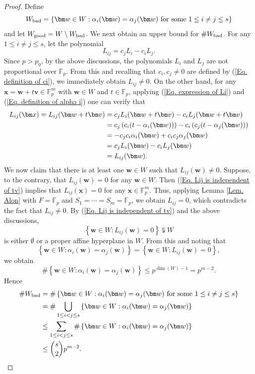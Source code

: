 \documentclass[12pt]{amsart}
\def\v{{\bm v}}
\def\w{{\bm w}}
\def\x{{\bm x}}
\def\bad{{\rm bad}}
\def\good{{\rm good}}
\theoremstyle{plain}
\theoremstyle{remark}
\begin{document}
\begin{proof}
Define 
$$W_{\bad}=\left\{\w\in W: \alpha_i(\w)=\alpha_j(\w)\ \text{for some $1\le i\neq j\le s$}\right\}$$
and let $W_{\good}=W\setminus W_{\bad}$. We next obtain an upper bound for $\# W_{\bad}$. For any $1\le i\neq j\le s$, let the polynomial
$$L_{ij}=c_jL_i-c_iL_j.$$
Since $p>p_0$, by the above discussions, the polynomials $L_i$ and $L_j$ are not proportional over $\mathbb{F}_p$. From this and recalling that  $c_i,c_j\neq 0$ are defined by (\ref{Eq. definition of ci}), we immediately obtain $L_{ij}\neq 0$. On the other hand, for any $\x=\w+t\v\in\mathbb{F}_p^m$ with $\w\in W$ and $t\in\mathbb{F}_p$, applying (\ref{Eq. expression of Li}) and (\ref{Eq. definition of alpha i}) one can verify that 
\begin{align}\label{Eq. Lij is independent of tv}
	L_{ij}(\x)=L_{ij}(\w+t\v)
&=c_jL_i(\w+t\v)-c_iL_j(\w+t\v)\notag\\
&=c_j\left(c_i(t-\alpha_i(\w))\right)-c_i\left(c_j(t-\alpha_j(\w))\right)\notag\\
&=-c_jc_i\alpha_i(\w)+c_ic_j\alpha_j(\w)\notag\\
&=c_jL_i(\w)-c_iL_j(\w)\notag\\
&=L_{ij}(\w).
\end{align}
We now claim that there is at least one $\w\in W$ such that $L_{ij}(\w)\neq 0$. Suppose, to the contrary, that $L_{ij}(\w)=0$ for any $\w\in W$. Then (\ref{Eq. Lij is independent of tv}) implies that $L_{ij}(\x)=0$ for any $\x\in\mathbb{F}_p^m$. Thus, applying Lemma \ref{Lem. Alon} with $F=\mathbb{F}_p$ and $S_1=\cdots=S_m=\mathbb{F}_p$, we obtain $L_{ij}=0$, which contradicts the fact that $L_{ij}\neq 0$. By (\ref{Eq. Lij is independent of tv}) and the above discussions, 
$$\left\{\w\in W: L_{ij}(\w)=0\right\}\subsetneqq W$$
is either $\emptyset$ or a proper affine hyperplane in $W$. From this and noting that 
$$\left\{\w\in W: \alpha_i(\w)=\alpha_j(\w)\right\}=\left\{\w\in W: L_{ij}(\w)=0\right\},$$
we obtain 
$$\#\left\{\w\in W: \alpha_i(\w)=\alpha_j(\w)\right\}\le p^{\dim(W)-1}=p^{m-2}.$$
Hence 
\begin{align}\label{Eq. upper bound for W bad}
	\#W_{\bad}
&=\#\left\{\w\in W: \alpha_i(\w)=\alpha_j(\w)\ \text{for some $1\le i\neq j\le s$}\right\}\notag\\
&=\#\bigcup_{1\le i<j\le s}\left\{\w\in W: \alpha_i(\w)=\alpha_j(\w)\right\}\notag\\
&\le \sum_{1\le i<j\le s}\#\left\{\w\in W: \alpha_i(\w)=\alpha_j(\w)\right\}\notag\\
&\le \binom{s}{2}p^{m-2}.
\end{align}


\end{proof}
\end{document}
